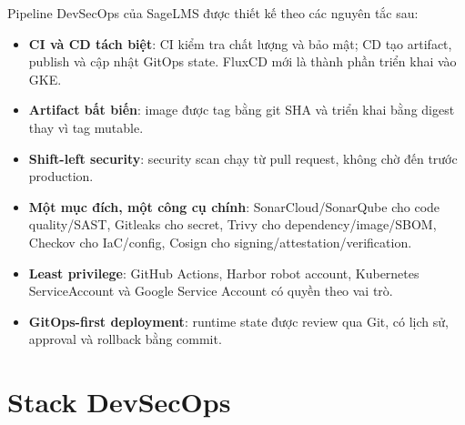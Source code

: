 Pipeline DevSecOps của SageLMS được thiết kế theo các nguyên tắc sau:

\begin{itemize}
  \item \textbf{CI và CD tách biệt}: CI kiểm tra chất lượng và bảo mật; CD tạo artifact, publish và cập nhật GitOps state. FluxCD mới là thành phần triển khai vào GKE.
  \item \textbf{Artifact bất biến}: image được tag bằng git SHA và triển khai bằng digest thay vì tag mutable.
  \item \textbf{Shift-left security}: security scan chạy từ pull request, không chờ đến trước production.
  \item \textbf{Một mục đích, một công cụ chính}: SonarCloud/SonarQube cho code quality/SAST, Gitleaks cho secret, Trivy cho dependency/image/SBOM, Checkov cho IaC/config, Cosign cho signing/attestation/verification.
  \item \textbf{Least privilege}: GitHub Actions, Harbor robot account, Kubernetes ServiceAccount và Google Service Account có quyền theo vai trò.
  \item \textbf{GitOps-first deployment}: runtime state được review qua Git, có lịch sử, approval và rollback bằng commit.
\end{itemize}

\section{Stack DevSecOps}

